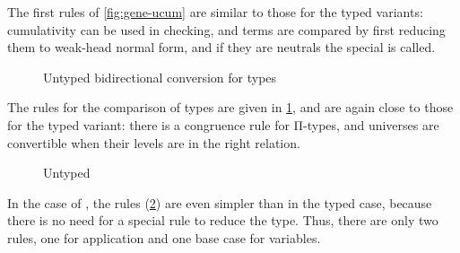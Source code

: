 \AP {}
The first rules of \cref{fig:gene-ucum} are similar to those for the typed variants: cumulativity can be used
in checking, and terms are compared by first reducing them to weak-head normal form, and if they are neutrals
the special  is called.

\begin{figure}[h]
  \ContinuedFloat
  \caption{Untyped bidirectional conversion for types}
  \label{fig:bd-cong-univ}
\end{figure}

\AP {}
The rules for the comparison of types are given in \cref{fig:bd-cong-univ}, and are again
close to those for the typed variant: there is a congruence rule for Π-types,
and universes are convertible when their levels are in the right relation.

\begin{figure}[h]
  \ContinuedFloat
  \caption{Untyped }
  \label{fig:neu-ucomp}
\end{figure}

\AP {}
In the case of , the rules (\cref{fig:neu-ucomp}) are even simpler
than in the typed case, because there is no need for a special rule to reduce the type.
Thus, there are only two rules, one for application and one base case for variables.

